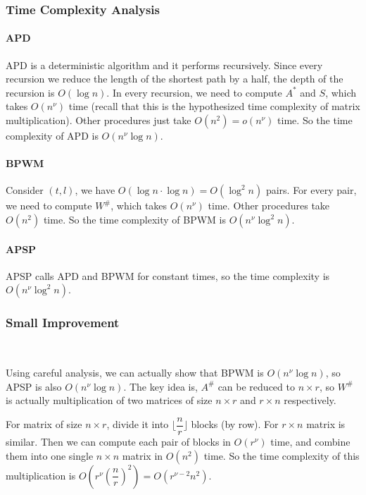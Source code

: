 \documentclass[11pt]{article}
\theoremstyle{plain}
\begin{document}
\subsubsection{Time Complexity Analysis}

\paragraph{APD} APD is a deterministic algorithm and it performs recursively. Since every recursion we reduce the length of the shortest path by a half, the depth of the recursion is $O(\log n)$. In every recursion, we need to compute $A^*$ and $S$, which takes $O(n^{\nu})$ time (recall that this is the hypothesized time complexity of matrix multiplication). Other procedures just take $O(n^2)=o(n^{\nu})$ time. So the time complexity of APD is $O(n^{\nu}\log n)$.

\paragraph{BPWM} Consider $(t,l)$, we have $O(\log n\cdot \log n)=O(\log^2 n)$ pairs. For every pair, we need to compute $W^{\#}$, which takes $O(n^{\nu})$ time. Other procedures take $O(n^2)$ time. So the time complexity of BPWM is $O(n^{\nu}\log^2 n)$.

\paragraph{APSP} APSP calls APD and BPWM for constant times, so the time complexity is $O(n^{\nu}\log^2 n)$.

\subsubsection{Small Improvement}
\label{imp}\

Using careful analysis, we can actually show that BPWM is $O(n^\nu \log n)$, so APSP is also $O(n^\nu \log n)$. The key idea is, $A^\#$ can be reduced to $n\times r$, so $W^\#$ is actually multiplication of two matrices of size $n\times r$ and $r\times n$ respectively.

For matrix of size $n\times r$, divide it into $\lfloor\dfrac{n}{r}\rfloor$ blocks (by row). For $r\times n$ matrix is similar. Then we can compute each pair of blocks in $O(r^{\nu})$ time, and combine them into one single $n\times n$ matrix in $O(n^2)$ time. So the time complexity of this multiplication is $O(r^\nu(\dfrac{n}{r})^2)=O(r^{\nu-2}n^2)$.
\end{document}
